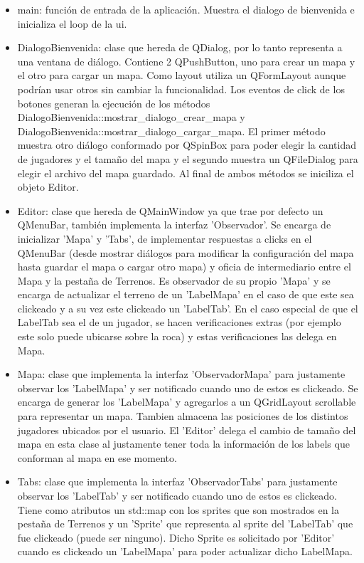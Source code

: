 \documentclass[titlepage,a4paper,12pt]{article}
\begin{document}
\begin{itemize}

\item main: función de entrada de la aplicación. Muestra el dialogo de bienvenida e inicializa el loop de la ui.

\item DialogoBienvenida: clase que hereda de QDialog, por lo tanto representa a una ventana de diálogo. Contiene 2 QPushButton, uno para crear un mapa y el otro para cargar un mapa. Como layout utiliza un QFormLayout aunque podrían usar otros sin cambiar la funcionalidad. Los eventos de click de los botones generan la ejecución de los métodos DialogoBienvenida::mostrar\_dialogo\_crear\_mapa y DialogoBienvenida::mostrar\_dialogo\_cargar\_mapa. El primer método muestra otro diálogo conformado por QSpinBox para poder elegir la cantidad de jugadores y el tamaño del mapa y el segundo muestra un QFileDialog para elegir el archivo del mapa guardado. Al final de ambos métodos se iniciliza el objeto Editor.

\item Editor: clase que hereda de QMainWindow ya que trae por defecto un QMenuBar, también implementa la interfaz 'Observador'. Se encarga de inicializar 'Mapa' y 'Tabs', de implementar respuestas a clicks en el QMenuBar (desde mostrar diálogos para modificar la configuración del mapa hasta guardar el mapa o cargar otro mapa) y oficia de intermediario entre el Mapa y la pestaña de Terrenos. Es observador de su propio 'Mapa' y se encarga de actualizar el terreno de un 'LabelMapa' en el caso de que este sea clickeado y a su vez este clickeado un 'LabelTab'. En el caso especial de que el LabelTab sea el de un jugador, se hacen verificaciones extras (por ejemplo este solo puede ubicarse sobre la roca) y estas verificaciones las delega en Mapa. 

\item Mapa: clase que implementa la interfaz 'ObservadorMapa' para justamente observar los 'LabelMapa' y ser notificado cuando uno de estos es clickeado. Se encarga de generar los 'LabelMapa' y agregarlos a un QGridLayout scrollable para representar un mapa. Tambien almacena las posiciones de los distintos jugadores ubicados por el usuario. El 'Editor' delega el cambio de tamaño del mapa en esta clase al justamente tener toda la información de los labels que conforman al mapa en ese momento. 

\item Tabs: clase que implementa la interfaz 'ObservadorTabs' para justamente observar los 'LabelTab' y ser notificado cuando uno de estos es clickeado. Tiene como atributos un std::map con los sprites que son mostrados en la pestaña de Terrenos y un 'Sprite' que representa al sprite del 'LabelTab' que fue clickeado (puede ser ninguno). Dicho Sprite es solicitado por 'Editor' cuando es clickeado un 'LabelMapa' para poder actualizar dicho LabelMapa.


\end{itemize}
\end{document}
